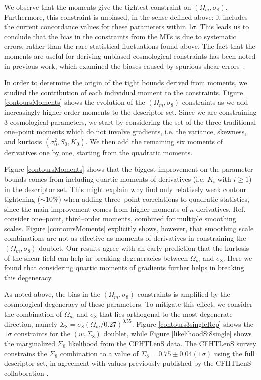 \documentclass[reprint,aps,prd,superscriptaddress,showkeys,showpacs]{revtex4-1}
\begin{document}
We observe that the moments give the tightest constraint on
$(\Omega_m,\sigma_8)$.  Furthermore, this constraint is unbiased, in
the sense defined above: it includes the current concordance values
for these parameters within 1$\sigma$.  This leads us to conclude that
the bias in the constraints from the MFs is due to systematic errors,
rather than the rare statistical fluctuations found above.
The fact that the moments are useful for deriving unbiased
cosmological constraints has been noted in previous work, which
examined the biases caused by spurious shear
errors~\citep{PetriSpurious}.

In order to determine the origin of the tight bounds derived from
moments, we studied the contribution of each individual moment to the
constraints. Figure \ref{contoursMoments} shows the evolution of the
$(\Omega_m,\sigma_8)$ constraints as we add increasingly higher-order
moments to the descriptor set. Since we are constraining 3
cosmological parameters, we start by considering the set of the three
traditional one--point moments which do not involve gradients,
i.e. the variance, skewness, and kurtosis $(\sigma_0^2,S_0,K_0)$. We
then add the remaining six moments of derivatives one by one, starting
from the quadratic moments. 

Figure \ref{contoursMoments} shows that the biggest improvement on the
parameter bounds comes from including quartic moments of derivatives
(i.e. $K_i$ with $i\ge1$) in the descriptor set. This might explain
why \citep{CFHTFu} find only relatively weak contour tightening
($\sim10\%$) when adding three--point correlations to quadratic
statistics, since the main improvement comes from higher moments of
$\kappa$ derivatives. Ref.~\citep{CFHTFu} consider one--point,
third--order moments, combined for multiple smoothing scales. Figure
\ref{contoursMoments} explicitly shows, however, that smoothing scale
combinations are not as effective as moments of derivatives in
constraining the $(\Omega_m,\sigma_8)$ doublet. Our results agree with
an early prediction \citep{moments4} that the kurtosis of the shear
field can help in breaking degeneracies between $\Omega_m$ and
$\sigma_8$.  Here we found that considering quartic moments of
gradients further helps in breaking this degeneracy.

As noted above, the bias in the $(\Omega_m,\sigma_8)$ constraints is
amplified by the cosmological degeneracy of these parameters. To
mitigate this effect, we consider the combination of $\Omega_m$ and
$\sigma_8$ that lies orthogonal to the most degenerate direction,
namely $\Sigma_8=\sigma_8(\Omega_m/0.27)^{0.55}$. Figure
\ref{contours3singleRep} shows the $1\sigma$ constraints for the
$(w,\Sigma_8)$ doublet, while Figure \ref{likelihoodSi8single} shows
the marginalized $\Sigma_8$ likelihood from the CFHTLenS data. The
CFHTLenS survey constrains the $\Sigma_8$ combination to a value of
$\Sigma_8=0.75\pm0.04(1\sigma)$ using the full descriptor set, in
agreement with values previously published by the CFHTLenS
collaboration \citep{CFHTKilbinger}. 
\end{document}
